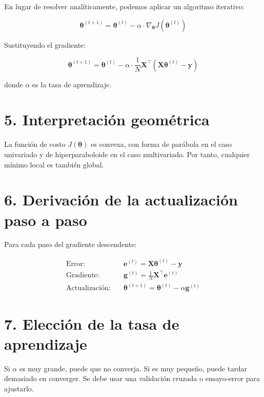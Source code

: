 \documentclass[12pt]{article}
\begin{document}
En lugar de resolver analíticamente, podemos aplicar un algoritmo iterativo:

\[
\boldsymbol{\theta}^{(t+1)} = \boldsymbol{\theta}^{(t)} - \alpha \cdot \nabla_{\boldsymbol{\theta}} J(\boldsymbol{\theta}^{(t)})
\]

Sustituyendo el gradiente:

\[
\boldsymbol{\theta}^{(t+1)} = \boldsymbol{\theta}^{(t)} - \alpha \cdot \frac{1}{N} \boldsymbol{X}^\top (\boldsymbol{X} \boldsymbol{\theta}^{(t)} - \boldsymbol{y})
\]

donde $\alpha$ es la tasa de aprendizaje.

\section*{5. Interpretación geométrica}

La función de costo $J(\boldsymbol{\theta})$ es convexa, con forma de parábola en el caso univariado y de hiperparaboloide en el caso multivariado. Por tanto, cualquier mínimo local es también global.

\section*{6. Derivación de la actualización paso a paso}

Para cada paso del gradiente descendente:

\begin{align*}
\text{Error:} &\quad \boldsymbol{e}^{(t)} = \boldsymbol{X} \boldsymbol{\theta}^{(t)} - \boldsymbol{y} \\
\text{Gradiente:} &\quad \boldsymbol{g}^{(t)} = \frac{1}{N} \boldsymbol{X}^\top \boldsymbol{e}^{(t)} \\
\text{Actualización:} &\quad \boldsymbol{\theta}^{(t+1)} = \boldsymbol{\theta}^{(t)} - \alpha \boldsymbol{g}^{(t)}
\end{align*}

\section*{7. Elección de la tasa de aprendizaje}

Si $\alpha$ es muy grande, puede que no converja. Si es muy pequeño, puede tardar demasiado en converger. Se debe usar una validación cruzada o ensayo-error para ajustarlo.
\end{document}
